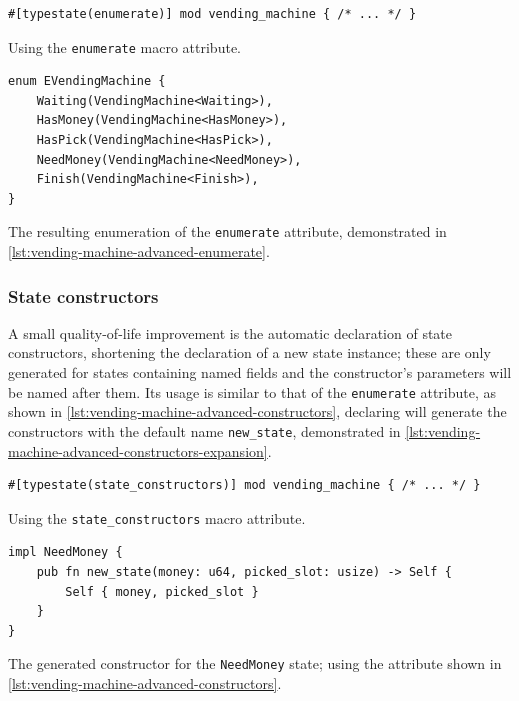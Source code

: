 \begin{listing}
    \begin{verbatim}
#[typestate(enumerate)] mod vending_machine { /* ... */ }
    \end{verbatim}
    \caption{Using the \texttt{enumerate} macro attribute.}
    \label{lst:vending-machine-advanced-enumerate}
\end{listing}

\begin{listing}
    \begin{verbatim}
enum EVendingMachine {
    Waiting(VendingMachine<Waiting>),
    HasMoney(VendingMachine<HasMoney>),
    HasPick(VendingMachine<HasPick>),
    NeedMoney(VendingMachine<NeedMoney>),
    Finish(VendingMachine<Finish>),
}
    \end{verbatim}
    \caption{The resulting enumeration of the \texttt{enumerate} attribute, demonstrated in \autoref{lst:vending-machine-advanced-enumerate}.}
    \label{lst:vending-machine-advanced-enumerate-expansion}
\end{listing}

\subsubsection{State constructors}

A small quality-of-life improvement is the automatic declaration of state constructors,
shortening the declaration of a new state instance;
these are only generated for states containing named fields and
the constructor's parameters will be named after them. %
Its usage is similar to that of the \texttt{enumerate} attribute, as shown in \autoref{lst:vending-machine-advanced-constructors},
declaring  will generate the constructors with the default name \texttt{new\_state},
demonstrated in \autoref{lst:vending-machine-advanced-constructors-expansion}.

\begin{listing}
    \begin{verbatim}
#[typestate(state_constructors)] mod vending_machine { /* ... */ }
    \end{verbatim}
    \caption{Using the \texttt{state\_constructors} macro attribute.}
    \label{lst:vending-machine-advanced-constructors}
\end{listing}


\begin{listing}
    \begin{verbatim}
impl NeedMoney {
    pub fn new_state(money: u64, picked_slot: usize) -> Self {
        Self { money, picked_slot }
    }
}
    \end{verbatim}
    \caption{
        The generated constructor for the \texttt{NeedMoney} state;
        using the attribute shown in \autoref{lst:vending-machine-advanced-constructors}.
    }
    \label{lst:vending-machine-advanced-constructors-expansion}
\end{listing}



